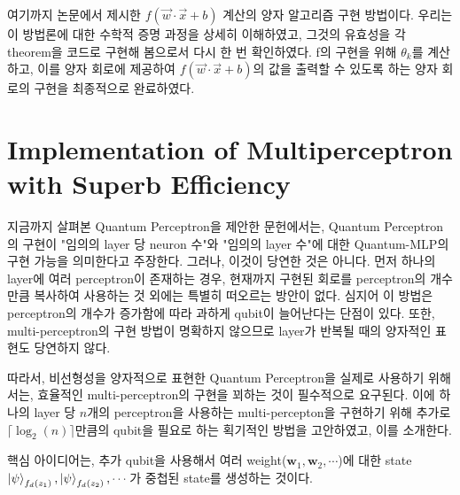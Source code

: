 여기까지 논문에서 제시한 \(f(\vec{w}\cdot\vec{x}+b)\) 계산의 양자 알고리즘 구현 방법이다.
우리는 이 방법론에 대한 수학적 증명 과정을 상세히 이해하였고, 그것의 유효성을 각 theorem을 코드로 구현해 봄으로서 다시 한 번 확인하였다.
f의 구현을 위해 \(\theta_k\)를 계산하고, 이를 양자 회로에 제공하여 \(f(\vec{w}\cdot\vec{x}+b)\)의 값을 출력할 수 있도록 하는 양자 회로의 구현을 최종적으로 완료하였다.

\section{Implementation of Multiperceptron with Superb Efficiency}

지금까지 살펴본 Quantum Perceptron을 제안한 문헌에서는, Quantum Perceptron의 구현이 "임의의 layer 당 neuron 수"와 "임의의 layer 수"에 대한 Quantum-MLP의 구현 가능을 의미한다고 주장한다. 그러나, 이것이 당연한 것은 아니다. 먼저 하나의 layer에 여러 perceptron이 존재하는 경우, 현재까지 구현된 회로를 perceptron의 개수만큼 복사하여 사용하는 것 외에는 특별히 떠오르는 방안이 없다. 심지어 이 방법은 perceptron의 개수가 증가함에 따라 과하게 qubit이 늘어난다는 단점이 있다. 또한, multi-perceptron의 구현 방법이 명확하지 않으므로 layer가 반복될 때의 양자적인 표현도 당연하지 않다.

따라서, 비선형성을 양자적으로 표현한 Quantum Perceptron을 실제로 사용하기 위해서는, 효율적인 multi-perceptron의 구현을 꾀하는 것이 필수적으로 요구된다. 이에 하나의 layer 당 $n$개의 perceptron을 사용하는 multi-percepton을 구현하기 위해 추가로 $\lceil {\log_2(n)} \rceil$만큼의 qubit을 필요로 하는 획기적인 방법을 고안하였고, 이를 소개한다. 

핵심 아이디어는, 추가 qubit을 사용해서 여러 weight($\mathbf{w}_1, \mathbf{w}_2, \cdots$)에 대한 state \( \ket{\psi}_{f_d(z_1)}, \ket{\psi}_{f_d(z_2)}, \cdots \)가 중첩된 state를 생성하는 것이다.

